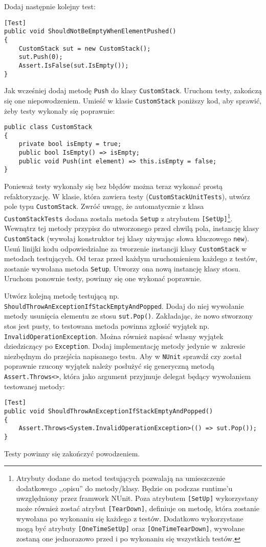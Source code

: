 Dodaj następnie kolejny test:
\begin{lstlisting}
[Test]
public void ShouldNotBeEmptyWhenElementPushed()
{
	CustomStack sut = new CustomStack();
	sut.Push(0);
	Assert.IsFalse(sut.IsEmpty());
}
\end{lstlisting}
Jak wcześniej dodaj metodę \texttt{Push} do klasy \texttt{CustomStack}. Uruchom testy, zakończą się one niepowodzeniem. Umieść w klasie \texttt{CustomStack} poniższy kod, aby sprawić, żeby testy wykonały się poprawnie:
\begin{lstlisting}
public class CustomStack
{
	private bool isEmpty = true;
	public bool IsEmpty() => isEmpty;
	public void Push(int element) => this.isEmpty = false;
}
\end{lstlisting}
Ponieważ testy wykonały się bez błędów można teraz wykonać prostą refaktoryzację. W klasie, która zawiera testy (\texttt{CustomStackUnitTests}), utwórz pole typu \texttt{CustomStack}. Zwróć uwagę, że automatycznie z klasa \texttt{CustomStackTests} dodana została metoda \texttt{Setup} z atrybutem \texttt{[SetUp]}\footnote{Atrybuty dodane do metod testujących pozwalają na umieszczenie dodatkowego ,,opisu'' do metody/klasy. Będzie on podczas runtime'u uwzględniony przez framwork NUnit. Poza atrybutem \texttt{[SetUp]} wykorzystany może również zostać atrybut \texttt{[TearDown]}, definiuje on metodę, która zostanie wywołana po wykonaniu się każdego z testów. Dodatkowo wykorzystane mogą być atrybuty \texttt{[OneTimeSetUp]} oraz \texttt{[OneTimeTearDown]}, wywołane zostaną one jednorazowo przed i po wykonaniu się wszystkich testów. }. Wewnątrz tej metody przypisz do utworzonego przed chwilą pola, instancję klasy \texttt{CustomStack} (wywołaj konstruktor tej klasy używając słowa kluczowego \texttt{new}). Usuń linijki kodu odpowiedzialne za tworzenie instancji klasy \texttt{CustomStack} w metodach testujących. Od teraz przed każdym uruchomieniem każdego z testów, zostanie wywołana metoda \texttt{Setup}. Utworzy ona nową instancję klasy stosu. Uruchom ponownie testy, powinny się one wykonać poprawnie.

Utwórz kolejną metodę testującą np. \texttt{ShouldThrowAnExceptionIfStackEmptyAndPopped}. Dodaj do niej wywołanie metody usunięcia elementu ze stosu \texttt{sut.Pop()}. Zakładając, że nowo stworzony stos jest pusty, to testowana metoda powinna zgłosić wyjątek np. \texttt{InvalidOperationException}. Można również napisać własny wyjątek dziedziczący po \texttt{Exception}. Dodaj implementację metody jedynie w~zakresie niezbędnym do przejścia napisanego testu. Aby w \texttt{NUnit} sprawdź czy został poprawnie rzucony wyjątek należy posłużyć się generyczną metodą \texttt{Assert.Throws<>}, która jako argument przyjmuje delegat będący wywołaniem testowanej metody:
\begin{lstlisting}
[Test]
public void ShouldThrowAnExceptionIfStackEmptyAndPopped()
{         
	Assert.Throws<System.InvalidOperationException>(() => sut.Pop());
}
\end{lstlisting}
Testy powinny się zakończyć powodzeniem.

